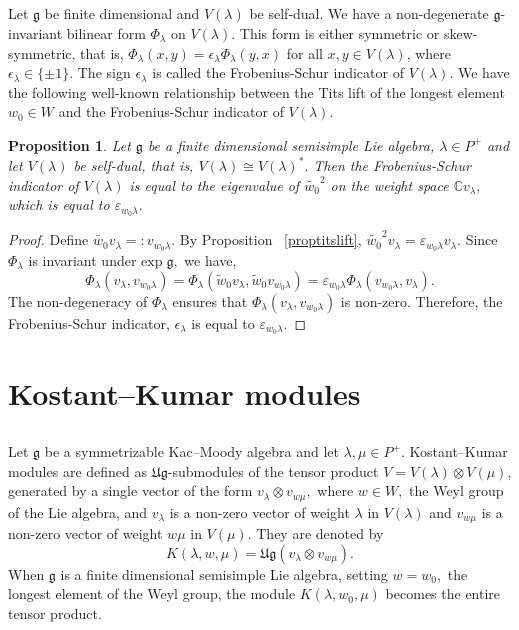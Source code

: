 \documentclass[12pt,reqno]{amsart}
\theoremstyle{plain}
\newtheorem{proposition}[theorem]{Proposition}
\theoremstyle{definition}
\theoremstyle{plain}
\newcommand{\lie}{\mathfrak}
\begin{document}
\subsection{}
Let $\lie g$ be  finite dimensional and $V(\lambda)$ be self-dual. We have a non-degenerate $\lie g$-invariant bilinear form $\Phi_{\lambda}$ on $V({\lambda})$. This form is either symmetric or skew-symmetric, that is,   $\Phi_{\lambda}(x,y)=\epsilon_\lambda\Phi_{\lambda}(y,x)$ for all
$x,y\in V({\lambda})$, where $\epsilon_\lambda\in\{\pm1\}.$ The sign $\epsilon_\lambda$ is called the Frobenius-Schur indicator of $V(\lambda).$
We have the following well-known relationship between the Tits lift of the longest element $w_0\in W$ and the Frobenius-Schur indicator of $V(\lambda)$.

\begin{proposition}
    Let $\lie g$ be a finite dimensional semisimple Lie algebra, $\lambda\in P^+$ and let $V(\lambda)$ be self-dual, that is,  $V(\lambda)\cong V(\lambda)^*.$ Then the Frobenius-Schur indicator of $V(\lambda)$ is equal to the eigenvalue of $\widetilde{w_0}^2$ on the weight space $\mathbb{C}v_\lambda,$ which is equal to $\varepsilon_{w_0\lambda}.$
\end{proposition}
\begin{proof}
    Define $\widetilde{w_0}v_\lambda=:v_{w_0\lambda}$. By Proposition ~\ref{proptitslift}, $\widetilde{w_0}^2v_\lambda=\varepsilon_{w_0\lambda}v_\lambda.$ Since $\Phi_\lambda$ is invariant under $\text {exp} \; \lie g,$ we have, $$\Phi_\lambda(v_\lambda,v_{w_0\lambda})=\Phi_\lambda(\widetilde{w}_0v_\lambda,\widetilde{w}_0v_{w_0\lambda})= \varepsilon_{w_0\lambda} \Phi_\lambda(v_{w_0\lambda}, v_\lambda).$$ The non-degeneracy of $\Phi_\lambda$ ensures that $\Phi_\lambda(v_\lambda,v_{w_0\lambda})$ is non-zero.
    Therefore, the Frobenius-Schur indicator, $\epsilon_\lambda$ is equal to $\varepsilon_{w_0\lambda}.$
    
\end{proof}

\section{Kostant--Kumar modules}
\subsection{}
Let $\lie g$ be a symmetrizable Kac--Moody algebra and let $\lambda, \mu \in P^+$. Kostant--Kumar modules are defined as $\mathfrak{Ug}$-submodules of the tensor product $V=V(\lambda)\otimes V(\mu)$, generated by a single vector of the form $v_\lambda\otimes v_{w\mu},$ where $w\in W,$ the Weyl group of the Lie algebra, and $v_\lambda$ is a non-zero vector of weight $\lambda$ in $V(\lambda)$ and $v_{w\mu}$ is a non-zero vector of weight $w\mu$ in $V(\mu).$ They are denoted by \[K(\lambda,w,\mu)=\mathfrak{Ug}(v_{\lambda}\otimes v_{w\mu}).\]
When $\lie g$ is a finite dimensional semisimple Lie algebra, setting $w=w_0,$ the longest element of the Weyl group, the module $K(\lambda, w_0, \mu)$ becomes the entire tensor product. 
\end{document}
